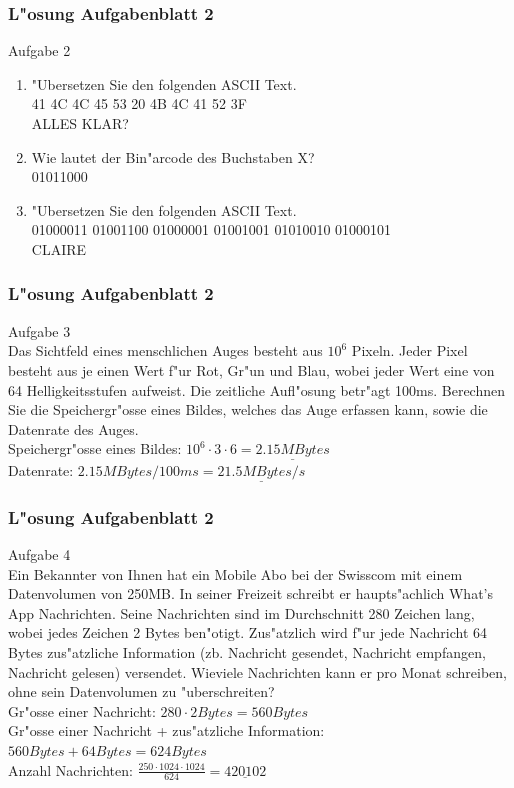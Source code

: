 \documentclass{beamer}
\begin{document}
\frame
{
	\frametitle{L"osung Aufgabenblatt 2}
	Aufgabe 2
	\begin{enumerate}
	\item "Ubersetzen Sie den folgenden ASCII Text.\\
	41 4C 4C 45 53 20 4B 4C 41 52 3F\\
	ALLES KLAR?
	\item Wie lautet der Bin"arcode des Buchstaben X?\\
	01011000
	\item "Ubersetzen Sie den folgenden ASCII Text.\\
	01000011 01001100 01000001 01001001 01010010 01000101\\
	CLAIRE
	\end{enumerate}
}

\frame
{
	\frametitle{L"osung Aufgabenblatt 2}
	Aufgabe 3\\
	Das Sichtfeld eines menschlichen Auges besteht aus $10^6$ Pixeln.
	Jeder Pixel besteht aus je einen Wert f"ur Rot, Gr"un und Blau,
	wobei jeder Wert eine von 64 Helligkeitsstufen aufweist. Die zeitliche
	Aufl"osung betr"agt 100ms. Berechnen Sie die Speichergr"osse eines Bildes,
	welches das Auge erfassen kann, sowie die Datenrate des Auges.\\
	\vspace{4mm}
	Speichergr"osse eines Bildes: $10^6 \cdot 3 \cdot 6 = \underline{2.15 MBytes}$\\
	Datenrate: $2.15 MBytes / 100 ms = \underline{21.5 MBytes / s}$
}

\frame
{
	\frametitle{L"osung Aufgabenblatt 2}
	Aufgabe 4\\
	{\small
	Ein Bekannter von Ihnen hat ein Mobile Abo bei der Swisscom mit einem Datenvolumen von
250MB. In seiner Freizeit schreibt er haupts"achlich What's App Nachrichten. Seine 
Nachrichten sind im Durchschnitt 280 Zeichen lang, wobei jedes Zeichen 2 Bytes ben"otigt. Zus"atzlich wird f"ur jede Nachricht 64 Bytes zus"atzliche
Information (zb. Nachricht gesendet, Nachricht empfangen, Nachricht gelesen)
versendet.
Wieviele Nachrichten kann er pro Monat schreiben, ohne sein Datenvolumen zu "uberschreiten?\\
	}
	\vspace{4mm}
	Gr"osse einer Nachricht: $280 \cdot 2 Bytes = 560 Bytes$\\
	Gr"osse einer Nachricht + zus"atzliche Information: $560 Bytes + 64 Bytes = 624 Bytes$\\
	Anzahl Nachrichten: $\frac{250 \cdot 1024 \cdot 1024}{624} = \underline{420102}$
}
\end{document}
